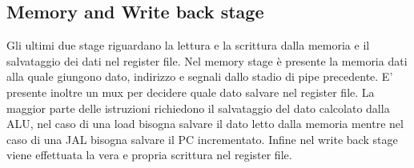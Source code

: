 \subsection{Memory and Write back stage}
Gli ultimi due stage riguardano la lettura e la scrittura dalla memoria e il salvataggio dei dati nel register file.
Nel memory stage è presente la memoria dati alla quale giungono dato, indirizzo e segnali dallo stadio di pipe precedente. E' presente inoltre un mux per decidere quale dato salvare nel register file. La maggior parte delle istruzioni richiedono il salvataggio del dato calcolato dalla ALU, nel caso di una load bisogna salvare il dato letto dalla memoria mentre nel caso di una JAL bisogna salvare il PC incrementato.
Infine nel write back stage viene effettuata la vera e propria scrittura nel register file.
